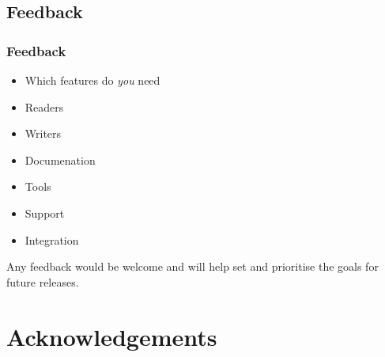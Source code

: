 \documentclass{beamer}
\begin{document}
\subsection{Feedback}
\begin{frame}
  \frametitle{Feedback}
  \begin{itemize}
  \item Which features do \emph{you} need
  \item Readers
  \item Writers
  \item Documenation
  \item Tools
  \item Support
  \item Integration
  \end{itemize}

  Any feedback would be welcome and will help set and prioritise the
  goals for future releases.
\end{frame}


\appendix

\section[]{Acknowledgements}
\end{document}
